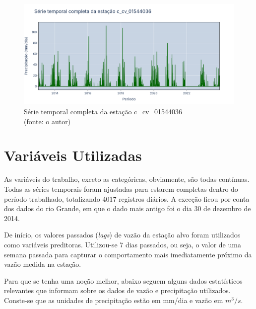 \begin{figure}[!h]
	\centering
	\includegraphics[scale=0.25]{Figuras/rio_sao_francisco/franciscoSerieCompleta_c_cv_01544036.png}
	\caption{Série temporal completa da estação c\_cv\_01544036\\(fonte: o autor)}
	\label{fig:franciscoSerieCompleta_c_cv_01544036}
\end{figure}
\clearpage

\section{Variáveis Utilizadas}

As variáveis do trabalho, exceto as categóricas, obviamente, são todas contínuas. Todas as séries temporais foram ajustadas para estarem completas dentro do período trabalhado, totalizando 4017 registros diários. A exceção ficou por conta dos dados do rio Grande, em que o dado mais antigo foi o dia 30 de dezembro de 2014.

De início, os valores passados (\textit{lags}) de vazão da estação alvo foram utilizados como variáveis preditoras. Utilizou-se 7 dias passados, ou seja, o valor de uma semana passada para capturar o comportamento mais imediatamente próximo da vazão medida na estação.

Para que se tenha uma noção melhor, abaixo seguem alguns dados estatísticos relevantes que informam sobre os dados de vazão e precipitação utilizados. Conste-se que as unidades de precipitação estão em mm/dia e vazão em $m^3/s$.

